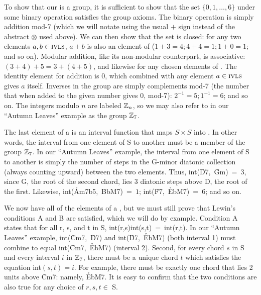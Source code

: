 To show that our \ivls{} is a group, it is sufficient to show that the set
$\{0,1,\ldots,6\}$ under some binary operation satisfies the group axioms. The
binary operation is simply addition mod-7 (which we will notate using the usual $+$
sign instead of the abstract $\otimes$ used above).  We can then show that the
set \ivls{} is closed: for any two elements $a, b \in \mathrm{\textsc{ivls}{}}$, $a + b$ is
also an element of \ivls{} ($1 + 3 = 4; 4 + 4 = 1; 1 + 0 = 1$; and so on).
Modular addition, like its non-modular counterpart, is associative:
$(3 + 4) + 5 = 3 + (4 + 5)$, and likewise for any chosen elements of \ivls{}.
The identity element for addition is $0$, which combined with any element $a \in
\mathrm{\textsc{ivls}{}}$ gives $a$ itself. Inverses in the group are simply complements
mod-7 (the number that when added to the given number gives $0$, mod-7):
$2^{-1} = 5; 1^{-1} = 6$; and so on. The integers modulo $n$ are labeled
$\mathbb{Z}_n$, so we may also refer to \ivls{} in our “Autumn Leaves” example as
the group $\mathbb{Z}_7$.

The last element of a \gis{} is an interval function that maps $S \times S$ into
\ivls{}. In other words, the interval from one element of S to another must be a
member of the group $\mathbb{Z}_7$. In our “Autumn Leaves” example, the interval
from one element of S to another is simply the number of steps in the G-minor
diatonic collection (always counting upward) between the two elements. Thus,
\mbox{int(\h{D7}, \h{Gm}) = $3$}, since G, the root of the second chord, lies
3 diatonic steps above D, the root of the first. Likewise,
\mbox{int(\h{Am7b5}, \h{BbM7}) = $1$}; \mbox{int(\h{F7}, \h{EbM7}) = $6$}; and so
on.

We now have all of the elements of a \gis{}, but we must still prove that Lewin’s
conditions A and B are satisfied, which we will do by example. Condition A
states that for all r, s, and t in S, \mbox{int(r,s)int(s,t) = int(r,t)}. In
our “Autumn Leaves” example, \mbox{int(\h{Cm7}, \h{D7})} and \mbox{int(\h{D7}, \h{EbM7})}
(both interval 1) must combine to equal \mbox{int(\h{Cm7}, \h{EbM7})} (interval
2). Second, for every chord $s$ in S and every interval $i$ in $\mathbb{Z}_7$,
there must be a unique chord $t$ which satisfies the equation \mbox{int$(s,t)
= i$}. For example, there must be exactly one chord that lies 2 units above
\h{Cm7}: namely, \h{EbM7}. It is easy to confirm that the two conditions
are also true for any choice of $r, s, t \in$ S.


